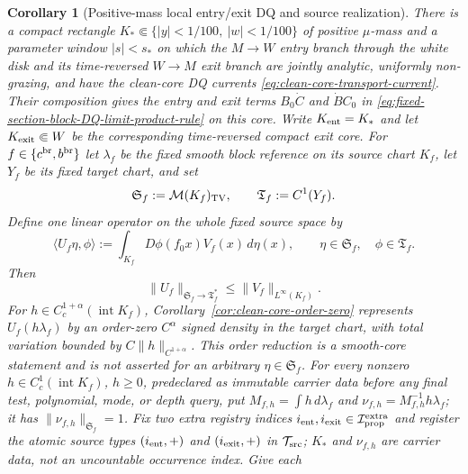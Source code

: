 \documentclass[11pt]{article}
\newtheorem{corollary}[theorem]{Corollary}
\begin{document}
\begin{corollary}[Positive-mass local entry/exit DQ and source realization]
\label{cor:fixed-section-local-block-DQ-realization}
There is a compact rectangle
$K_*\Subset\{|y|<1/100,\ |w|<1/100\}$ of positive $\mu$-mass and a parameter
window $|s|<s_*$ on which the $M\to W$ entry branch through the white disk
and its time-reversed $W\to M$ exit branch are jointly analytic, uniformly
non-grazing, and have the clean-core DQ currents
\eqref{eq:clean-core-transport-current}.  Their composition gives the
entry and exit terms $B_0\dot C$ and $\dot B C_0$ in
\eqref{eq:fixed-section-block-DQ-limit-product-rule} on this core.
Write $K_{\rm ent}=K_*$ and let $K_{\rm exit}\Subset W$ be the corresponding
time-reversed compact exit core.  For $f\in\{c^{\rm br},b^{\rm br}\}$ let
$\lambda_f$ be the fixed smooth block reference on its source chart
$K_f$, let $Y_f$ be its fixed target chart, and set
\begin{equation}
\label{eq:fixed-section-local-core-Banach-pair}
 \mathfrak S_f:=\mathcal M(K_f)_{\rm TV},
 \qquad \mathfrak T_f:=C^1(Y_f).
\end{equation}
Define one linear operator on the whole fixed source space by
\begin{equation}
\label{eq:fixed-section-local-core-source-operator}
 \langle U_f\eta,\phi\rangle
 :=\int_{K_f}D\phi(f_0x)V_f(x)\,d\eta(x),
 \qquad \eta\in\mathfrak S_f,\quad \phi\in\mathfrak T_f.
\end{equation}
Then
\begin{equation}
\label{eq:fixed-section-local-core-operator-bound}
\|U_f\|_{\mathfrak S_f\to\mathfrak T_f^*}
 \le\|V_f\|_{L^\infty(K_f)}.
\end{equation}
For $h\in C_c^{1+\alpha}(\operatorname{int}K_f)$,
Corollary~\ref{cor:clean-core-order-zero} represents $U_f(h\lambda_f)$ by
an order-zero $C^\alpha$ signed density in the target chart, with total
variation bounded by $C\|h\|_{C^{1+\alpha}}$.  This order reduction is a
smooth-core statement and is not asserted for an arbitrary
$\eta\in\mathfrak S_f$.
For every nonzero $h\in C_c^1(\operatorname{int}K_f)$, $h\ge0$, predeclared as
immutable carrier data before any final test, polynomial, mode, or depth
query, put
$M_{f,h}=\int h\,d\lambda_f$ and
$\nu_{f,h}=M_{f,h}^{-1}h\lambda_f$; it has
$\|\nu_{f,h}\|_{\mathfrak S_f}=1$.
Fix two extra registry indices
$i_{\rm ent},i_{\rm exit}\in\mathcal I_{\rm prop}^{\rm extra}$ and register
the atomic source types $(i_{\rm ent},+)$ and $(i_{\rm exit},+)$ in
$\mathcal T_{\rm src}$; $K_*$ and
$\nu_{f,h}$ are carrier data, not an uncountable occurrence index.  Give each

\end{corollary}
\end{document}
